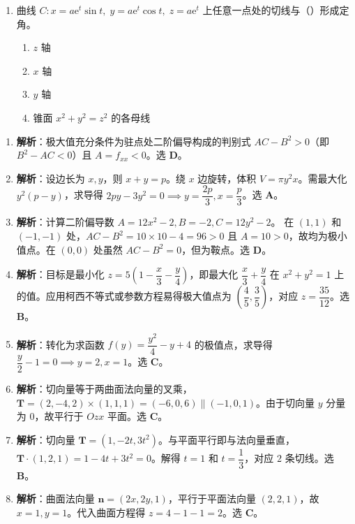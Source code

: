 \documentclass[lang=cn,11pt]{elegantbook}
\begin{document}
\begin{exercise}
\begin{enumerate}
  \item 曲线 $C:x=a\mathrm{e}^t\sin t,\;y=a\mathrm{e}^t\cos t,\;z=a\mathrm{e}^t$ 上任意一点处的切线与（\qquad）形成定角。
    \begin{enumerate}
      \item[(A)] $z$ 轴
      \item[(B)] $x$ 轴
      \item[(C)] $y$ 轴
      \item[(D)] 锥面 $x^2+y^2=z^2$ 的各母线
    \end{enumerate}
\end{enumerate}
\end{exercise}

\begin{solution}
\begin{enumerate}
  \item \textbf{解析}：极大值充分条件为驻点处二阶偏导构成的判别式 $AC-B^2 > 0$（即 $B^2-AC < 0$）且 $A = f_{xx} < 0$。选 \textbf{D}。
  \item \textbf{解析}：设边长为 $x, y$，则 $x+y=p$。绕 $x$ 边旋转，体积 $V = \pi y^2 x$。需最大化 $y^2(p-y)$，求导得 $2py - 3y^2 = 0 \implies y = \dfrac{2p}{3}, x = \dfrac{p}{3}$。选 \textbf{A}。
  \item \textbf{解析}：计算二阶偏导数 $A = 12x^2-2, B = -2, C = 12y^2-2$。
  在 $(1,1)$ 和 $(-1,-1)$ 处，$AC-B^2 = 10 \times 10 - 4 = 96 > 0$ 且 $A=10>0$，故均为极小值点。在 $(0,0)$ 处虽然 $AC-B^2=0$，但为鞍点。选 \textbf{D}。
  \item \textbf{解析}：目标是最小化 $z = 5\left(1 - \dfrac{x}{3} - \dfrac{y}{4}\right)$，即最大化 $\dfrac{x}{3} + \dfrac{y}{4}$ 在 $x^2+y^2=1$ 上的值。应用柯西不等式或参数方程易得极大值点为 $\left(\dfrac{4}{5}, \dfrac{3}{5}\right)$，对应 $z = \dfrac{35}{12}$。选 \textbf{B}。
  \item \textbf{解析}：转化为求函数 $f(y) = \dfrac{y^2}{4} - y + 4$ 的极值点，求导得 $\dfrac{y}{2} - 1 = 0 \implies y=2, x=1$。选 \textbf{C}。
  \item \textbf{解析}：切向量等于两曲面法向量的叉乘，$\boldsymbol T = (2, -4, 2) \times (1, 1, 1) = (-6, 0, 6) \parallel (-1, 0, 1)$。由于切向量 $y$ 分量为 $0$，故平行于 $Ozx$ 平面。选 \textbf{C}。
  \item \textbf{解析}：切向量 $\boldsymbol T = (1, -2t, 3t^2)$。与平面平行即与法向量垂直，$\boldsymbol T \cdot (1,2,1) = 1 - 4t + 3t^2 = 0$。解得 $t=1$ 和 $t=\dfrac{1}{3}$，对应 $2$ 条切线。选 \textbf{B}。
  \item \textbf{解析}：曲面法向量 $\boldsymbol n = (2x, 2y, 1)$，平行于平面法向量 $(2, 2, 1)$，故 $x=1, y=1$。代入曲面方程得 $z = 4-1-1 = 2$。选 \textbf{C}。

\end{enumerate}
\end{solution}
\end{document}
